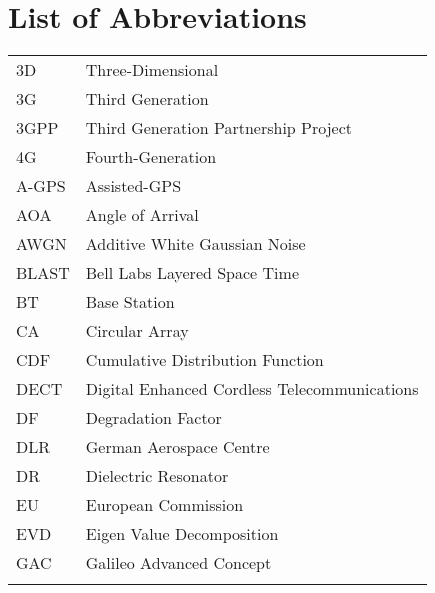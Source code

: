 \tableofcontents   %
\listoffigures     %
\listoftables      %

\chapter*{List of Abbreviations}
\begin{tabular}{ll}
\\
3D & Three-Dimensional\\

3G & Third Generation\\

3GPP & Third Generation Partnership Project\\

4G & Fourth-Generation\\

A-GPS & Assisted-GPS\\

AOA & Angle of Arrival\\

AWGN & Additive White Gaussian Noise\\

BLAST & Bell Labs Layered Space Time\\

BT & Base Station\\

CA & Circular Array\\

CDF & Cumulative Distribution Function\\

DECT  &  Digital Enhanced Cordless Telecommunications\\

DF & Degradation Factor\\

DLR & German Aerospace Centre\\


DR & Dielectric Resonator\\

EU  & European Commission \\


EVD & Eigen Value Decomposition \\

GAC & Galileo Advanced Concept\\



\\
\end{tabular}


